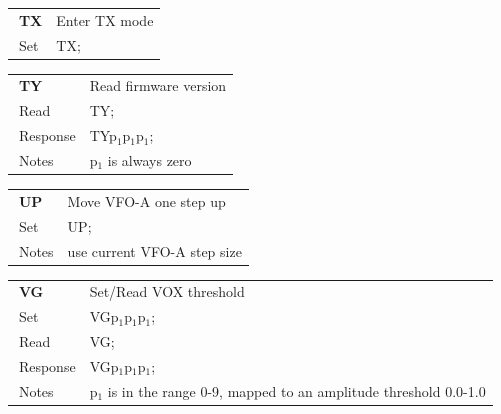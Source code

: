 \documentclass[12pt]{book}
\begin{document}
\begin{center}
\begin{tabular}{|p{2cm}|p{11cm}|}
\toprule
$\phantom{\Big|}$\textbf{\large TX} & Enter TX mode \\\cline{1-2}
$\phantom{\Big|}${\large Set} & {TX;} \\\hline
\bottomrule
\end{tabular}
\end{center}

\begin{center}
\begin{tabular}{|p{2cm}|p{11cm}|}
\toprule
$\phantom{\Big|}$\textbf{\large TY} & Read firmware version \\\cline{1-2}
$\phantom{\Big|}${\large Read} & {TY;} \\\hline
$\phantom{\Big|}${\large Response} & {TYp$_1$p$_1$p$_1$;} \\\hline
$\phantom{\Big|}${\large Notes} & \multicolumn{1}{|p{11cm}|}{p$_1$ is always zero} \\
\bottomrule
\end{tabular}
\end{center}

\begin{center}
\begin{tabular}{|p{2cm}|p{11cm}|}
\toprule
$\phantom{\Big|}$\textbf{\large UP} & Move VFO-A one step up \\\cline{1-2}
$\phantom{\Big|}${\large Set} & {UP;} \\\hline
$\phantom{\Big|}${\large Notes} & \multicolumn{1}{|p{11cm}|}{use current VFO-A step size} \\
\bottomrule
\end{tabular}
\end{center}

\begin{center}
\begin{tabular}{|p{2cm}|p{11cm}|}
\toprule
$\phantom{\Big|}$\textbf{\large VG} & Set/Read VOX threshold \\\cline{1-2}
$\phantom{\Big|}${\large Set} & {VGp$_1$p$_1$p$_1$;} \\\hline
$\phantom{\Big|}${\large Read} & {VG;} \\\hline
$\phantom{\Big|}${\large Response} & {VGp$_1$p$_1$p$_1$;} \\\hline
$\phantom{\Big|}${\large Notes} & \multicolumn{1}{|p{11cm}|}{p$_1$ is in the range 0-9, mapped to an amplitude threshold 0.0-1.0} \\
\bottomrule
\end{tabular}
\end{center}
\end{document}
